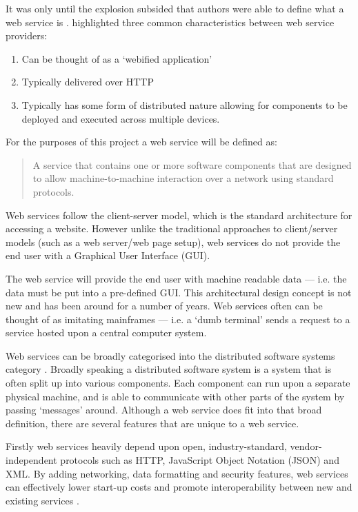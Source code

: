 It was only until the explosion subsided that authors were able to define what 
a web service is \citep{kalin13}. \citet{kalin13} highlighted three 
common characteristics between web service providers:

\begin{enumerate}
  \item Can be thought of as a  `webified application'
  \item Typically delivered over HTTP
  \item Typically has some form of distributed nature allowing for components 
  to be deployed and executed across multiple devices.
\end{enumerate}

For the purposes of this project a web service will be defined as:

\begin{quote}
  A service that contains one or more software components that are designed to 
  allow machine-to-machine interaction over a network using standard protocols.
\end{quote}

Web services follow the client-server model, which is the standard architecture
for accessing a website. However unlike the traditional approaches to 
client/server models (such as a web server/web page setup), web services do not
provide the end user with a Graphical User Interface (GUI).

The web service will provide the end user with machine readable data --- i.e. 
the data must be put into a pre-defined GUI. This architectural design concept 
is not new and has been around for a number of years. Web services often can be
thought of as imitating mainframes --- i.e. a `dumb terminal' sends a request 
to a service hosted upon a central computer system.

Web services can be broadly categorised into the distributed software systems 
category \citep{kalin13}. Broadly speaking a distributed software system is a 
system that is often split up into various components. Each component can run 
upon a separate physical machine, and is able to communicate with other parts 
of the system by passing `messages' around. Although a web service does fit 
into that broad definition, there are several features that are unique to a 
web service.

Firstly web services heavily depend upon open, industry-standard, 
vendor-independent protocols such as HTTP, JavaScript Object Notation (JSON) and XML. By adding networking, 
data formatting and security features, web services can effectively lower 
start-up costs and promote interoperability between new and existing services 
\citep{kalin13}.

